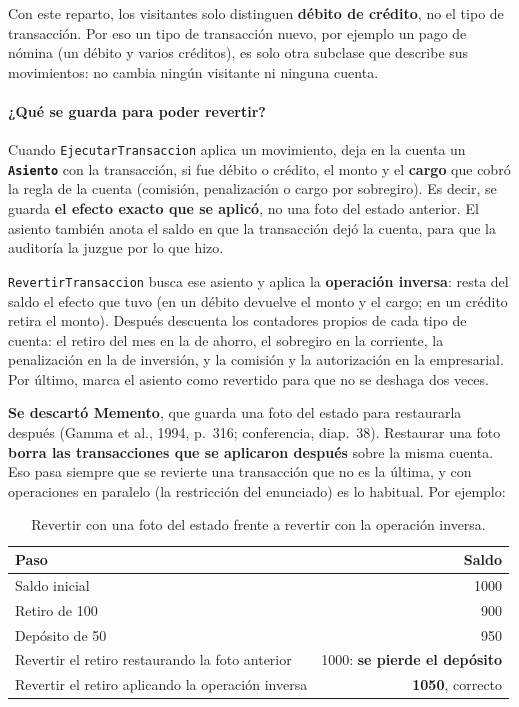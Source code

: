 Con este reparto, los visitantes solo distinguen \textbf{débito de crédito}, no el tipo de
transacción. Por eso un tipo de transacción nuevo, por ejemplo un pago de nómina (un débito y
varios créditos), es solo otra subclase que describe sus movimientos: no cambia ningún
visitante ni ninguna cuenta.

\paragraph{¿Qué se guarda para poder revertir?}
Cuando \texttt{EjecutarTransaccion} aplica un movimiento, deja en la cuenta un
\textbf{\texttt{Asiento}} con la transacción, si fue débito o crédito, el monto y el
\textbf{cargo} que cobró la regla de la cuenta (comisión, penalización o cargo por
sobregiro). Es decir, se guarda \textbf{el efecto exacto que se aplicó}, no una foto del
estado anterior. El asiento también anota el saldo en que la transacción dejó la cuenta, para
que la auditoría la juzgue por lo que hizo.

\texttt{RevertirTransaccion} busca ese asiento y aplica la \textbf{operación inversa}: resta
del saldo el efecto que tuvo (en un débito devuelve el monto y el cargo; en un crédito retira
el monto). Después descuenta los contadores propios de cada tipo de cuenta: el retiro del mes
en la de ahorro, el sobregiro en la corriente, la penalización en la de inversión, y la
comisión y la autorización en la empresarial. Por último, marca el asiento como revertido
para que no se deshaga dos veces.

\textbf{Se descartó Memento}, que guarda una foto del estado para restaurarla después
(Gamma et al., 1994, p.~316; conferencia, diap.~38). Restaurar una foto \textbf{borra las
transacciones que se aplicaron después} sobre la misma cuenta. Eso pasa siempre que se
revierte una transacción que no es la última, y con operaciones en paralelo (la restricción
del enunciado) es lo habitual. Por ejemplo:

\begin{table}[H]
\centering
\small
\begin{tabular}{lr}
\toprule
\textbf{Paso} & \textbf{Saldo} \\
\midrule
Saldo inicial & 1000 \\
Retiro de 100 & 900 \\
Depósito de 50 & 950 \\
Revertir el retiro restaurando la foto anterior & 1000: \textbf{se pierde el depósito} \\
Revertir el retiro aplicando la operación inversa & \textbf{1050}, correcto \\
\bottomrule
\end{tabular}
\caption{Revertir con una foto del estado frente a revertir con la operación inversa.}
\end{table}

